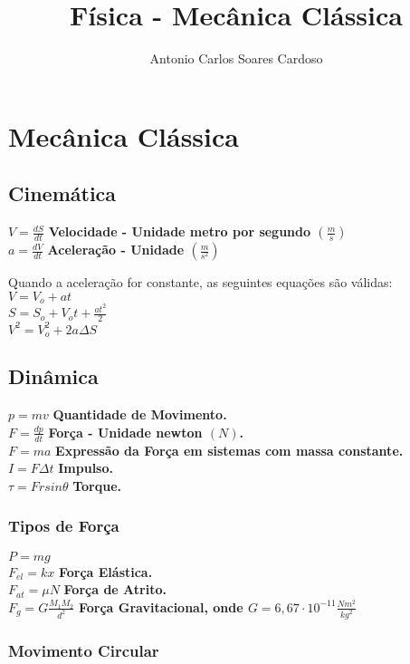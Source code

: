\documentclass[
    12pt, %
    openright,
    twoside, %
    a4paper, %
    article,
    english,brazil %
]{abntex2}
\author{Antonio Carlos Soares Cardoso}
\title{Física - Mecânica Clássica}
\makeatletter
\renewcommand\tableofcontents{%
  \null\hfill\textbf{\Large\contentsname}\hfill\null\par
  \@mkboth{\MakeUppercase\contentsname}{\MakeUppercase\contentsname}%
  \@starttoc{toc}%
}
\makeatother
\begin{document}
\tableofcontents

\newpage

\textual

\noindent

\chapter{Mecânica Clássica} 

\section{Cinemática}

$V = \frac{dS}{dt}$ \quad \textbf{Velocidade - Unidade metro por segundo $(\frac{m}{s})$} \\
$a = \frac{dV}{dt}$ \quad \textbf{Aceleração - Unidade $(\frac{m}{s^2})$}

\noindent
Quando a aceleração for constante, as seguintes equações são válidas:
\\
\noindent
$V = V_o + at$ \\
$S = S_o + V_ot + \frac{at^2}{2}$ \\
$V^2 = V_o^2 + 2a\Delta S$

\section{Dinâmica}

$p = mv$ \quad \textbf{Quantidade de Movimento.} \\
$F = \frac{dp}{dt}$ \quad \textbf{Força - Unidade newton $(N)$.} \\
$F = ma$ \quad \textbf{Expressão da Força em sistemas com massa constante.} \\
$I = F\Delta t$ \quad \textbf{Impulso.} \\
$\tau = Frsin\theta$ \quad \textbf{Torque.}

\subsection{Tipos de Força} 

$P = mg$ \\
$F_{el} = kx$ \quad \textbf{Força Elástica.} \\
$F_{at} = \mu N$ \quad \textbf{Força de Atrito.} \\
$F_{g} = G\frac{M_1M_2}{d^2}$ \textbf{Força Gravitacional, onde $G = 6,67 \cdot 10^{-11} \frac{Nm^2}{kg^2}$}

\subsection{Movimento Circular}
\end{document}
